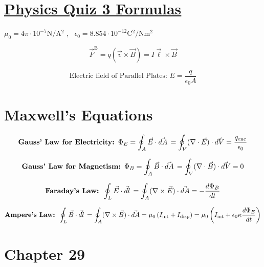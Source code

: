 \documentclass[fleqn,12pt]{article}
\begin{document}
\setlength{\abovedisplayskip}{2pt}
\setlength{\belowdisplayskip}{2pt}
\section*{\LARGE\underline{Physics Quiz 3 Formulas}}
$ \mu_0 = 4\pi \cdot 10^{-7} \si{\newton\per\ampere^2}$ , \, 
$\epsilon_0 = 8.854 \cdot 10^{-12} \si{\coulomb^2\per\newton\meter^2}$

\begin{equation}
  \vec{F}^\mathrm{B} = q(\vec{v} \times \vec{B}) = I\vec{\ell} \times \vec{B}
\end{equation}

$$\textrm{Electric field of Parallel Plates: } E = \frac{q}{\epsilon_0A}$$

\section*{Maxwell's Equations}
\begin{equation} \label{eq1}
 \mbox{\textbf{Gauss' Law for Electricity: }}\Phi_{E} = 
    \oint_A \vec{E} \cdot \vec{dA} \, = \oint_V ( \nabla \cdot \vec{E}) \cdot \vec{dV}
= \frac{q_\mathrm{enc}}{\epsilon_0}
\end{equation}

\begin{equation} \label{eq1}
 \mbox{\textbf{Gauss' Law for Magnetism: }}\Phi_{B} = 
    \oint_A \vec{B} \cdot \vec{dA} \, = \oint_V ( \nabla \cdot \vec{B}) \cdot \vec{dV}
= 0
\end{equation}

\begin{equation} \label{eq1}
 \mbox{\textbf{Faraday's Law: }}
    \oint_L \vec{E} \cdot \vec{dl} \, = \oint_A ( \nabla \times \vec{E}) \cdot \vec{dA}
= - \frac{d\Phi_{B}}{dt}
\end{equation}

\begin{equation} \label{eq1}
 \mbox{\textbf{Ampere's Law: }}
    \oint_L \vec{B} \cdot \vec{dl} \, = \oint_A ( \nabla \times \vec{B}) \cdot \vec{dA} = \mu_{0}\left(I_\mathrm{int} + I_\mathrm{disp}\right)
= \mu_{0}\left(I_\mathrm{int} + \epsilon_{0}\kappa\frac{d\Phi_{E}}{dt}\right) 
\end{equation}

\section*{Chapter 29}
\end{document}
